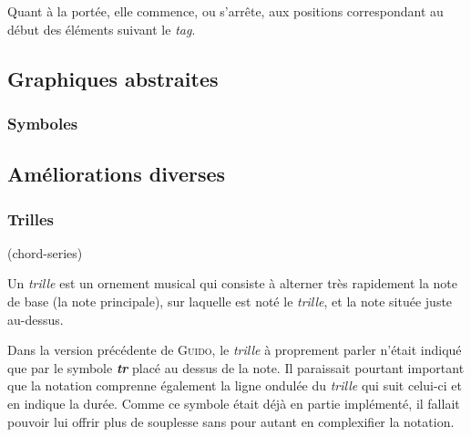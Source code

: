 \documentclass{article}
\newenvironment{gmncode}	{\vspace{-2mm}\small\verbatim}{\endverbatim\vspace{-2mm}}
\newcommand{\guido}			{\textsc{Guido}}
\begin{document}
Quant à la portée, elle commence, ou s'arrête, aux positions correspondant au début des éléments suivant le \emph{tag}.


\subsection{Graphiques abstraites}\label{subsec:graphiquesAbstraites}


\subsubsection{Symboles}\label{subsubsec:symboles}



\subsection{Améliorations diverses}\label{subsec:amelioraions}


\subsubsection{Trilles}\label{subsubsec:trilles}


\begin{gmncode}
(chord-series)
\end{gmncode}

Un \emph{trille} est \og{}un ornement musical qui consiste à alterner très rapidement la note de base (la note principale), sur laquelle est noté le \emph{trille}, et la note située juste au-dessus\fg{}.

Dans la version précédente de \guido, le \emph{trille} à proprement parler n'était indiqué que par le symbole \textit{\textbf{tr}} placé au dessus de la note. Il paraissait pourtant important que la notation comprenne également la ligne ondulée du \emph{trille} qui suit celui-ci et en indique la durée. Comme ce symbole était déjà en partie implémenté, il fallait pouvoir lui offrir plus de souplesse sans pour autant en complexifier la notation.

\end{document}
